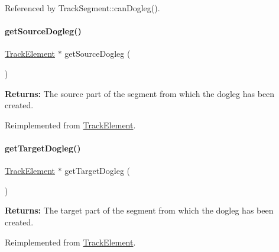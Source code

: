 Referenced by Track\+Segment\+::can\+Dogleg().

\mbox{\label{classKite_1_1TrackSegment_a7e79fbfe77f173d46b1959c41087930a}} 
\paragraph{\texorpdfstring{get\+Source\+Dogleg()}{getSourceDogleg()}}
{\footnotesize\ttfamily \mbox{\hyperlink{classKite_1_1TrackElement}{Track\+Element}} $\ast$ get\+Source\+Dogleg (\begin{DoxyParamCaption}{ }\end{DoxyParamCaption})\hspace{0.3cm}{\ttfamily [virtual]}}

{\bfseries Returns\+:} The source part of the segment from which the dogleg has been created. 

Reimplemented from \mbox{\hyperlink{classKite_1_1TrackElement_a7e79fbfe77f173d46b1959c41087930a}{Track\+Element}}.

\mbox{\label{classKite_1_1TrackSegment_aeb4e39bd925d093e6c45599433bb421c}} 
\paragraph{\texorpdfstring{get\+Target\+Dogleg()}{getTargetDogleg()}}
{\footnotesize\ttfamily \mbox{\hyperlink{classKite_1_1TrackElement}{Track\+Element}} $\ast$ get\+Target\+Dogleg (\begin{DoxyParamCaption}{ }\end{DoxyParamCaption})\hspace{0.3cm}{\ttfamily [virtual]}}

{\bfseries Returns\+:} The target part of the segment from which the dogleg has been created. 

Reimplemented from \mbox{\hyperlink{classKite_1_1TrackElement_aeb4e39bd925d093e6c45599433bb421c}{Track\+Element}}.

\mbox{\label{classKite_1_1TrackSegment_aa0ba92ebf19f596537dc051c090d5736}} 
